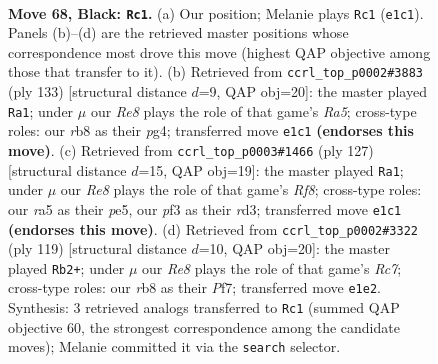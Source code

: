 \documentclass[11pt]{article}
\begin{document}
\clearpage

\begin{figure}[p]\centering
\begin{subfigure}{0.46\textwidth}\centering
\resizebox{\linewidth}{!}{%
\newchessgame
\chessboard[
  setfen={1R6/5p2/4p1k1/R7/P3P3/5PK1/8/4r3 b - - 28 68},
  showmover=false,
  pgfstyle=straightmove, color=movearrow, markmove={e1-c1}
]}
\caption{}
\end{subfigure}\hfill
\begin{subfigure}{0.46\textwidth}\centering
\resizebox{\linewidth}{!}{%
\newchessgame
\chessboard[
  setfen={8/5p2/4p1k1/1R6/r2P2P1/4KP2/8/8 b - - 2 67},
  showmover=false,
  pgfstyle=straightmove, color=movearrow, markmove={a4-a1}
]}
\caption{}
\end{subfigure}
\\[4pt]
\begin{subfigure}{0.46\textwidth}\centering
\resizebox{\linewidth}{!}{%
\newchessgame
\chessboard[
  setfen={8/5pk1/4p3/4P3/5PP1/3R2K1/8/5r2 b - - 44 64},
  showmover=false,
  pgfstyle=straightmove, color=movearrow, markmove={f1-a1}
]}
\caption{}
\end{subfigure}\hfill
\begin{subfigure}{0.46\textwidth}\centering
\resizebox{\linewidth}{!}{%
\newchessgame
\chessboard[
  setfen={R7/P4pk1/1K6/6p1/6Pp/7P/2r2P2/8 b - - 18 60},
  showmover=false,
  pgfstyle=straightmove, color=movearrow, markmove={c2-b2}
]}
\caption{}
\end{subfigure}
\caption{\textbf{Move 68, Black: \texttt{Rc1}.} (a) Our position; Melanie plays \texttt{Rc1} (\texttt{e1c1}). Panels (b)--(d) are the retrieved master positions whose correspondence most drove this move (highest QAP objective among those that transfer to it). (b) Retrieved from \texttt{ccrl\_top\_p0002\#3883} (ply 133) [structural distance $d$=9, QAP obj=20]: the master played \texttt{Ra1}; under $\mu$ our \emph{Re8} plays the role of that game's \emph{Ra5}; cross-type roles: our \emph{r}b8 as their \emph{p}g4; transferred move \texttt{e1c1} \textbf{(endorses this move)}. (c) Retrieved from \texttt{ccrl\_top\_p0003\#1466} (ply 127) [structural distance $d$=15, QAP obj=19]: the master played \texttt{Ra1}; under $\mu$ our \emph{Re8} plays the role of that game's \emph{Rf8}; cross-type roles: our \emph{r}a5 as their \emph{p}e5, our \emph{p}f3 as their \emph{r}d3; transferred move \texttt{e1c1} \textbf{(endorses this move)}. (d) Retrieved from \texttt{ccrl\_top\_p0002\#3322} (ply 119) [structural distance $d$=10, QAP obj=20]: the master played \texttt{Rb2+}; under $\mu$ our \emph{Re8} plays the role of that game's \emph{Rc7}; cross-type roles: our \emph{r}b8 as their \emph{P}f7; transferred move \texttt{e1e2}. Synthesis: 3 retrieved analogs transferred to \texttt{Rc1} (summed QAP objective 60, the strongest correspondence among the candidate moves); Melanie committed it via the \texttt{search} selector.}
\label{fig:thought-m135}
\end{figure}
\end{document}
